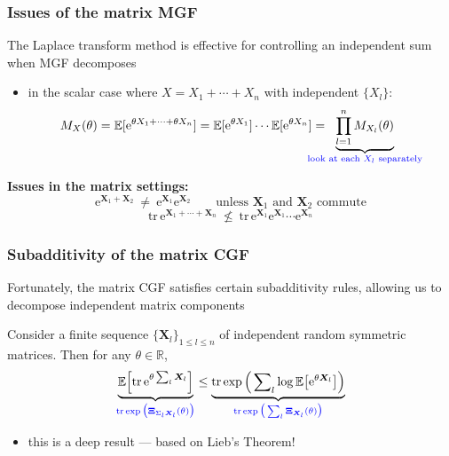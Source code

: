 \documentclass[compress,
mathserif,wide,%
]{beamer}
\begin{document}
\begin{frame}
\frametitle{Issues of the matrix MGF}  

The Laplace transform method is effective for controlling an independent sum when MGF decomposes

\begin{itemize}
	\item in the scalar case where $X=X_{1}+\cdots+X_{n}$ with independent $\{X_{l}\}$:
	\[
		M_{X}(\theta)=\mathbb{E}[\mathrm{e}^{\theta X_1 + \cdots + \theta X_n}]= \mathbb{E}[\mathrm{e}^{\theta X_{1}}] \cdots \mathbb{E}[\mathrm{e}^{\theta X_{n}}] = \hspace{-1.7em}\underset{\textcolor{blue}{ \text{look at each }X_l\text{ separately}}}{\underbrace{ \prod_{l=1}^{n} M_{X_{l}}(\theta) }}
	\]
\end{itemize}

\vfill

{\bf Issues in the matrix settings:} 
%
\[
	\mathrm{e}^{\bm{X}_{1}+\bm{X}_{2}} ~\neq~ \mathrm{e}^{\bm{X}_{1}}\mathrm{e}^{\bm{X}_{2}}\qquad\text{unless }\bm{X}_{1}\text{ and }\bm{X}_{2}\text{ commute}
\]
%
\[
	\mathrm{tr}\,\mathrm{e}^{\bm{X}_{1}+\cdots+\bm{X}_{n}} ~\nleq~ \mathrm{tr}\,\mathrm{e}^{\bm{X}_{1}}\mathrm{e}^{\bm{X}_{1}}\cdots\mathrm{e}^{\bm{X}_{n}}
\]

\end{frame}




\begin{frame}
\frametitle{Subadditivity of the matrix CGF}  

Fortunately, the matrix CGF satisfies certain subadditivity rules, allowing us to decompose independent matrix components 

\bigskip


\begin{lemma}
	\label{lem:subadditive-CGF}
	Consider a finite sequence $\{\bm{X}_l\}_{1\leq l\leq n}$ of independent random symmetric matrices. Then for any $\theta \in \mathbb{R}$, 
	\[
		\underset{\textcolor{blue}{  \mathrm{tr} \exp\big(\bm{\Xi}_{\Sigma_{l}\bm{X}_{l}}(\theta)\big) }}{\underbrace{ \mathbb{E}\Big[\mathrm{tr}\,\mathrm{e}^{\theta\sum_{l}\bm{X}_{l}}\Big] }} 
		\leq
		\underset{\textcolor{blue}{  \mathrm{tr} \exp\big(\sum_{l}\bm{\Xi}_{\bm{X}_{l}}(\theta)\big) }}{\underbrace{ \mathrm{tr} \exp\Big(\sum\nolimits _{l}\log\mathbb{E}\big[\mathrm{e}^{\theta\bm{X}_{l}}\big]\Big) }}
	\]

	
\end{lemma}

	
\begin{itemize}
	\item this is a deep result --- based on Lieb's Theorem! 
\end{itemize}



\end{frame}
\end{document}
